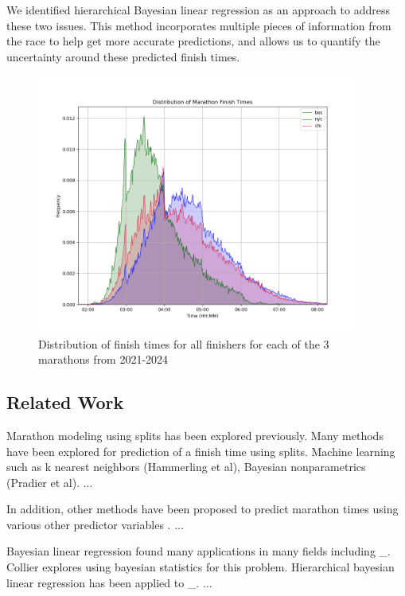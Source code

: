 \documentclass[USenglish,twocolumn]{article}
\theoremstyle{dgthm}
\theoremstyle{dgdef}
\begin{document}
We identified hierarchical Bayesian linear regression as an approach to address these two issues. This method incorporates multiple pieces of information from the race to help get more accurate predictions, and allows us to quantify the uncertainty around these predicted finish times.


\begin{figure}[ht]
    \centering
    \includegraphics[width=4.2in]{../analysis/plot_dist.png}
    \caption{Distribution of finish times for all finishers for each of the 3 marathons from 2021-2024}
    \label{fig:plotdist}
\end{figure}

\subsection{Related Work} 
Marathon modeling using splits has been explored previously. Many methods have been explored for prediction of a finish time using splits. Machine learning such as k nearest neighbors  (Hammerling et al), Bayesian nonparametrics (Pradier et al). ...

In addition, other methods have been proposed to predict marathon times using various other predictor variables \cite{schmid:2012}. ...

Bayesian linear regression found many applications in many fields including \_. Collier \cite{collier:2017} explores using bayesian statistics for this problem. Hierarchical bayesian linear regression has been applied to \_.  ...
\end{document}
